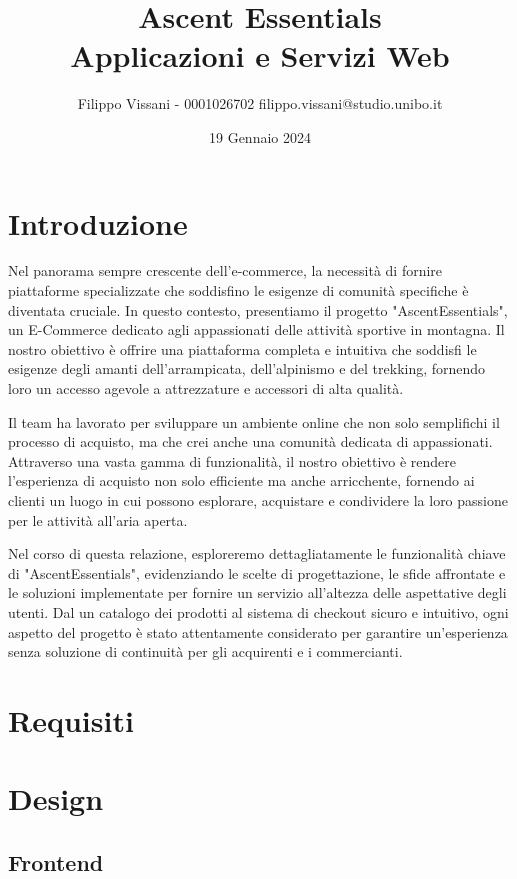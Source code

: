 \documentclass[12pt,a4paper,openright,twoside]{book}
\title{
    Ascent Essentials \\
    \large Applicazioni e Servizi Web
}
\author{Filippo Vissani - 0001026702 filippo.vissani@studio.unibo.it}
\date{19 Gennaio 2024}
\begin{document}
\maketitle
\chapter{Introduzione}
Nel panorama sempre crescente dell'e-commerce, la necessità di fornire piattaforme specializzate che soddisfino le esigenze di comunità specifiche è diventata cruciale. In questo contesto, presentiamo il progetto "AscentEssentials", un E-Commerce dedicato agli appassionati delle attività sportive in montagna. Il nostro obiettivo è offrire una piattaforma completa e intuitiva che soddisfi le esigenze degli amanti dell'arrampicata, dell'alpinismo e del trekking, fornendo loro un accesso agevole a attrezzature e accessori di alta qualità.

Il team ha lavorato per sviluppare un ambiente online che non solo semplifichi il processo di acquisto, ma che crei anche una comunità dedicata di appassionati. Attraverso una vasta gamma di funzionalità, il nostro obiettivo è rendere l'esperienza di acquisto non solo efficiente ma anche arricchente, fornendo ai clienti un luogo in cui possono esplorare, acquistare e condividere la loro passione per le attività all'aria aperta.

Nel corso di questa relazione, esploreremo dettagliatamente le funzionalità chiave di "AscentEssentials", evidenziando le scelte di progettazione, le sfide affrontate e le soluzioni implementate per fornire un servizio all'altezza delle aspettative degli utenti. Dal un catalogo dei prodotti al sistema di checkout sicuro e intuitivo, ogni aspetto del progetto è stato attentamente considerato per garantire un'esperienza senza soluzione di continuità per gli acquirenti e i commercianti.

\chapter{Requisiti}

\chapter{Design}

\section{Frontend}
\end{document}
